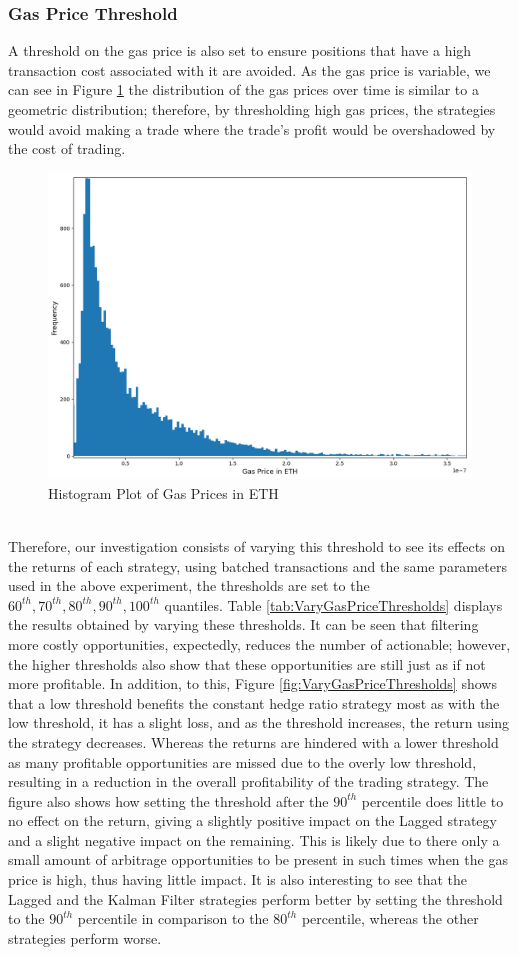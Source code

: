 \subsubsection{Gas Price Threshold}
A threshold on the gas price is also set to ensure positions that have a high transaction cost associated with it are avoided. As the gas price is variable, we can see in Figure \ref{fig:GasPriceHistogram} the distribution of the gas prices over time is similar to a geometric distribution; therefore, by thresholding high gas prices, the strategies would avoid making a trade where the trade's profit would be overshadowed by the cost of trading.
\begin{figure}[h!]
    \centering
    \includegraphics[width=0.7\linewidth]{evaluation/Images/GasPriceHistogram.png}
    \caption{Histogram Plot of Gas Prices in ETH}
    \label{fig:GasPriceHistogram}
\end{figure}
\\[3mm]
\noindent Therefore, our investigation consists of varying this threshold to see its effects on the returns of each strategy, using batched transactions and the same parameters used in the above experiment, the thresholds are set to the $60^{th}, 70^{th},80^{th},90^{th},100^{th}$ quantiles. Table \ref{tab:VaryGasPriceThresholds} displays the results obtained by varying these thresholds. It can be seen that filtering more costly opportunities, expectedly, reduces the number of actionable; however, the higher thresholds also show that these opportunities are still just as if not more profitable. In addition, to this, Figure \ref{fig:VaryGasPriceThresholds} shows that a low threshold benefits the constant hedge ratio strategy most as with the low threshold, it has a slight loss, and as the threshold increases, the return using the strategy decreases. Whereas the returns are hindered with a lower threshold as many profitable opportunities are missed due to the overly low threshold, resulting in a reduction in the overall profitability of the trading strategy. The figure also shows how setting the threshold after the $90^{th}$ percentile does little to no effect on the return, giving a slightly positive impact on the Lagged strategy and a slight negative impact on the remaining. This is likely due to there only a small amount of arbitrage opportunities to be present in such times when the gas price is high, thus having little impact. It is also interesting to see that the Lagged and the Kalman Filter strategies perform better by setting the threshold to the $90^{th}$ percentile in comparison to the $80^{th}$ percentile, whereas the other strategies perform worse.
